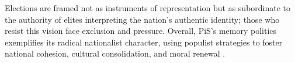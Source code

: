 Elections are framed not as instruments of representation but as subordinate to the authority of elites interpreting the nation’s authentic identity; those who resist this vision face exclusion and pressure. Overall, PiS’s memory politics exemplifies its radical nationalist character, using populist strategies to foster national cohesion, cultural consolidation, and moral renewal \citep{jaskulowski_populist_2023}.

